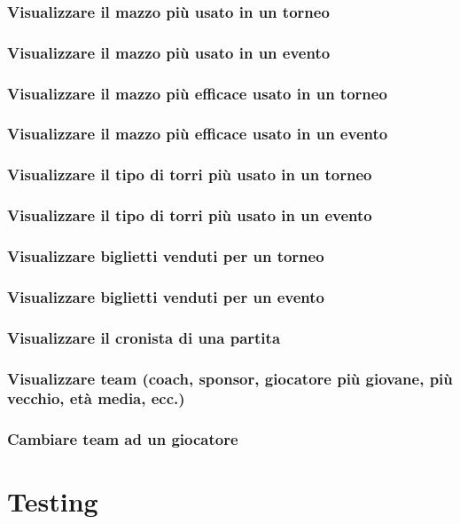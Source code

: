 \documentclass{article}
\begin{document}
\subsubsection{Visualizzare il mazzo più usato in un torneo}
\subsubsection{Visualizzare il mazzo più usato in un evento}
\subsubsection{Visualizzare il mazzo più efficace usato in un torneo}
\subsubsection{Visualizzare il mazzo più efficace usato in un evento}
\subsubsection{Visualizzare il tipo di torri più usato in un torneo}
\subsubsection{Visualizzare il tipo di torri più usato in un evento}
\subsubsection{Visualizzare biglietti venduti per un torneo }
\subsubsection{Visualizzare biglietti venduti per un evento  }
\subsubsection{Visualizzare il cronista di una partita}
\subsubsection{Visualizzare team (coach, sponsor, giocatore più giovane, più vecchio, età media, ecc.)}
\subsubsection{Cambiare team ad un giocatore}


\section{Testing}
\end{document}
